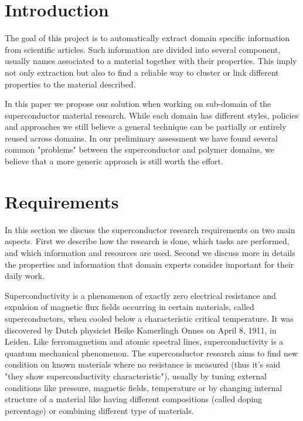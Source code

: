 \documentclass{article}
\begin{document}
\pagebreak

\section{Introduction}

The goal of this project is to automatically extract domain specific information from scientific articles. Such information are divided into several component, usually names associated to a material together with their properties. This imply not only extraction but also to find a reliable way to cluster or link different properties to the material described. 

In this paper we propose our solution when working on sub-domain of the superconductor material research. 
While each domain has different styles, policies and approaches we still believe a general technique can be partially or entirely reused across domains. In our preliminary assessment we have found several common "problems" between the superconductor and polymer domains, we believe that a more generic approach is still worth the effort. 


\section{Requirements}

In this section we discuss the superconductor research requirements on two main aspects. First we describe how the research is done, which tasks are performed, and which information and resources are used. Second we discuss more in details the properties and information that domain experts consider important for their daily work. 

Superconductivity is a phenomenon of exactly zero electrical resistance and expulsion of magnetic flux fields occurring in certain materials, called superconductors, when cooled below a characteristic critical temperature. It was discovered by Dutch physicist Heike Kamerlingh Onnes on April 8, 1911, in Leiden. Like ferromagnetism and atomic spectral lines, superconductivity is a quantum mechanical phenomenon.
The superconductor research aims to find new condition on known materials where no resistance is measured (thus it's said "they show superconductivity characteristic"), usually by tuning external conditions like pressure, magnetic fields, temperature or by changing internal structure of a material like having different compositions (called doping percentage) or combining different type of materials.
\end{document}
